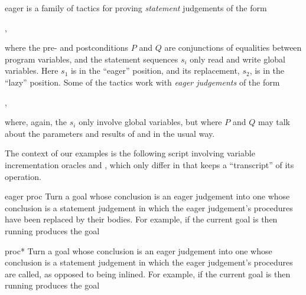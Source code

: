 \begin{tactic}{eager}
   is a family of tactics for proving \prhl \emph{statement}
  judgements of the form
  \begin{center}
    ,
  \end{center}
  where the pre- and postconditions $P$ and $Q$ are conjunctions of
  equalities between program variables, and the statement sequences
  $s_i$ only read and write global variables.  Here $s_1$ is in the
  ``eager'' position, and its replacement, $s_2$, is in the ``lazy''
  position. Some of the tactics work with \emph{eager judgements} of
  the form
  \begin{center}
    ,
  \end{center}
  where, again, the $s_i$ only involve global variables, but where
  $P$ and $Q$ may talk about the parameters and results of
   and  in the usual way.

  \medskip The context of our examples is the following \EasyCrypt
  script involving variable incrementation oracles  and
  , which only differ in that  keeps a ``transcript''
  of its operation.

  \begin{tsyntax}{eager proc}
  Turn a goal whose conclusion is an eager judgement into one
  whose conclusion is a \prhl statement judgement in which
  the eager judgement's procedures have been replaced by their
  bodies.
  \medskip
  For example, if the current goal is
   then
  running 
  produces the goal
  \end{tsyntax}

  \begin{tsyntax}{proc*}
  Turn a goal whose conclusion is an eager judgement into one
  whose conclusion is a \prhl statement judgement in which
  the eager judgement's procedures are called, as opposed to
  being inlined.
  \medskip
  For example, if the current goal is
   then
  running 
  produces the goal
  \end{tsyntax}


\end{tactic}
